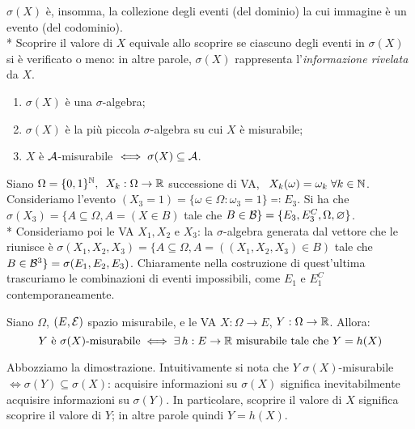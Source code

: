 $\sigma(X)$ è, insomma, la collezione degli eventi (del dominio) la cui immagine è un evento (del codominio). \\*
Scoprire il valore di $X$ equivale allo scoprire se ciascuno degli eventi in $\sigma(X)$ si è verificato o meno: in altre parole, $\sigma(X)$ rappresenta l'\emph{informazione rivelata} da $X$.

\medskip
\begin{prop}
  \Fixvmode
  \begin{enumerate}
    \item $\sigma(X)$ è una $\sigma$-algebra;
    \item $\sigma(X)$ è la più piccola $\sigma$-algebra su cui $X$ è misurabile;
    \item $X$ è $\mathcal A$-misurabile $\iff \sigma(X) \subseteq \mathcal A$.
  \end{enumerate}
\end{prop}

\medskip
\begin{ese}
	Siano $\Omega = \{0,1\}^{\mathbb N}, \enspace X_k: \Omega \to \mathbb R$ successione di VA, $\enspace X_k (\omega) = \omega_k \; \forall k \in \mathbb N$.
	Consideriamo l'evento $(X_3 = 1) = \{\omega \in \Omega: \omega_3 = 1\} \eqqcolon E_3$. Si ha che $\sigma(X_3) = \{A \subseteq \Omega, A = (X \in B)$ tale che $ B \in \mathcal B\} = \{E_3, E_3^C, \Omega, \varnothing\}$. \\*
  Consideriamo poi le VA $X_1, X_2$ e $X_3$: la $\sigma$-algebra generata dal vettore che le riunisce è $\sigma(X_1, X_2, X_3) = \{A \subseteq \Omega, A = ((X_1, X_2, X_3) \in B) $ tale che $ B \in \mathcal B^3\} = \sigma(E_1, E_2, E_3)$. Chiaramente nella costruzione di quest'ultima trascuriamo le combinazioni di eventi impossibili, come $E_1$ e $E_1^C$ contemporaneamente.
\end{ese}

\medskip
\begin{lemma}
  Siano $\Omega$, $(E, \mathcal E)$ spazio misurabile, e le VA $X:\Omega \to E$, $Y: \Omega \to \mathbb R$. Allora:\\
  $$Y \text{ è } \sigma(X)\text{-misurabile} \iff
  \exists \, h: E \to \mathbb R \text{ misurabile tale che } Y = h(X)$$
\end{lemma}

Abbozziamo la dimostrazione.
Intuitivamente si nota che $Y$ $\sigma(X)$-misurabile $\iff \sigma(Y) \subseteq \sigma(X)$: acquisire informazioni su $\sigma(X)$ significa inevitabilmente acquisire informazioni su $\sigma(Y)$. In particolare, scoprire il valore di $X$ significa scoprire il valore di $Y$; in altre parole quindi $Y = h(X)$.

